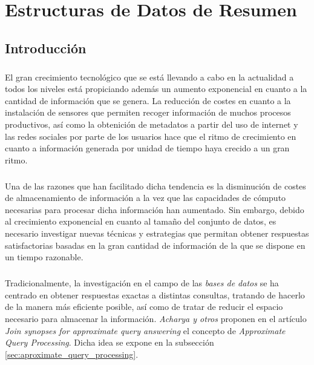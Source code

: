 \documentclass{subfiles}
\begin{document}
  \chapter{Estructuras de Datos de Resumen}
  \label{chapter:summaries}

    \section{Introducción}
    \label{sec:summaries_intro}

      \paragraph{}
      El gran crecimiento tecnológico que se está llevando a cabo en la actualidad a todos los niveles está propiciando además un aumento exponencial en cuanto a la cantidad de información que se genera. La reducción de costes en cuanto a la instalación de sensores que permiten recoger información de muchos procesos productivos, así como la obtenición de metadatos a partir del uso de internet y las redes sociales por parte de los usuarios hace que el ritmo de crecimiento en cuanto a información generada por unidad de tiempo haya crecido a un gran ritmo.

      \paragraph{}
      Una de las razones que han facilitado dicha tendencia es la disminución de costes de almacenamiento de información a la vez que las capacidades de cómputo necesarias para procesar dicha información han aumentado. Sin embargo, debido al crecimiento exponencial en cuanto al tamaño del conjunto de datos, es necesario investigar nuevas técnicas y estrategias que permitan obtener respuestas satisfactorias basadas en la gran cantidad de información de la que se dispone en un tiempo razonable.

      \paragraph{}
      Tradicionalmente, la investigación en el campo de las \emph{bases de datos} se ha centrado en obtener respuestas exactas a distintas consultas, tratando de hacerlo de la manera más eficiente posible, así como de tratar de reducir el espacio necesario para almacenar la información. \emph{Acharya y otros} proponen en el artículo \emph{Join synopses for approximate query answering} \cite{acharya1999join} el concepto de \emph{Approximate Query Processing}. Dicha idea se expone en la subsección \ref{sec:aproximate_query_processing}.
\end{document}
